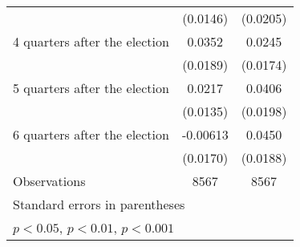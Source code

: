 \begin{table}[htbp]
\begin{tabular}{l*{2}{c}}
                    &    (0.0146)         &    (0.0205)         \\
[1em]
 4 quarters after the election&      0.0352         &      0.0245         \\
                    &    (0.0189)         &    (0.0174)         \\
[1em]
 5 quarters after the election&      0.0217         &      0.0406\sym{*}  \\
                    &    (0.0135)         &    (0.0198)         \\
[1em]
 6 quarters after the election&    -0.00613         &      0.0450\sym{*}  \\
                    &    (0.0170)         &    (0.0188)         \\
\hline
Observations        &        8567         &        8567         \\
\hline\hline
\multicolumn{3}{l}{\footnotesize Standard errors in parentheses}\\
\multicolumn{3}{l}{\footnotesize \sym{*} \(p<0.05\), \sym{**} \(p<0.01\), \sym{***} \(p<0.001\)}\\
\end{tabular}
\end{table}
